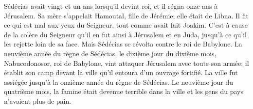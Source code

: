 Sédécias avait vingt et un ans lorsqu’il devint roi, et il régna onze ans à Jérusalem.
	Sa mère s’appelait Hamoutal, fille de Jérémie; elle était de Libna.
Il fit ce qui est mal aux yeux du Seigneur, tout comme avait fait Joakim.
C’est à cause de la colère du Seigneur qu’il en fut ainsi à Jérusalem et en Juda,
	jusqu’à ce qu’il les rejette loin de sa face.
Mais Sédécias se révolta contre le roi de Babylone.
La neuvième année du règne de Sédécias, le dixième jour du dixième mois,
	Nabucodonosor, roi de Babylone, vint attaquer Jérusalem avec toute son armée;
	il établit son camp devant la ville qu’il entoura d’un ouvrage fortifié.
La ville fut assiégée jusqu’à la onzième année du règne de Sédécias.
Le neuvième jour du quatrième mois, la famine était devenue terrible dans la ville
	et les gens du pays n’avaient plus de pain.
